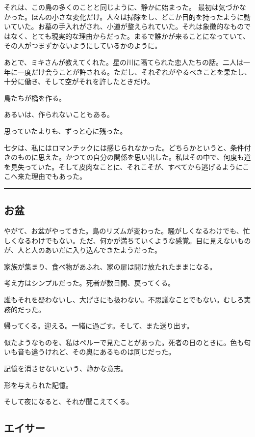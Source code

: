 \documentclass[
  letterpaper,
  oneside]{scrbook}
\begin{document}
それは、この島の多くのことと同じように、静かに始まった。
最初は気づかなかった。ほんの小さな変化だけ。人々は掃除をし、どこか目的を持ったように動いていた。お墓の手入れがされ、小道が整えられていた。それは象徴的なものではなく、とても現実的な理由からだった。まるで誰かが来ることになっていて、その人がつまずかないようにしているかのように。

あとで、ミキさんが教えてくれた。星の川に隔てられた恋人たちの話。二人は一年に一度だけ会うことが許される。ただし、それぞれがやるべきことを果たし、十分に働き、そして空がそれを許したときだけ。

鳥たちが橋を作る。

あるいは、作られないこともある。

思っていたよりも、ずっと心に残った。

七夕は、私にはロマンチックには感じられなかった。どちらかというと、条件付きのものに思えた。かつての自分の関係を思い出した。私はその中で、何度も道を見失っていた。そして皮肉なことに、それこそが、すべてから逃げるようにここへ来た理由でもあった。

\begin{center}\rule{0.5\linewidth}{0.5pt}\end{center}

\subsection{お盆}\label{ux304aux76c6}

やがて、お盆がやってきた。島のリズムが変わった。騒がしくなるわけでも、忙しくなるわけでもない。ただ、何かが満ちていくような感覚。目に見えないものが、人と人のあいだに入り込んできたようだった。

家族が集まり、食べ物があふれ、家の扉は開け放たれたままになる。

考え方はシンプルだった。死者が数日間、戻ってくる。

誰もそれを疑わないし、大げさにも扱わない。不思議なことでもない。むしろ実務的だった。

帰ってくる。迎える。一緒に過ごす。そして、また送り出す。

似たようなものを、私はペルーで見たことがあった。死者の日のときに。色も匂いも音も違うけれど、その奥にあるものは同じだった。

記憶を消させないという、静かな意志。

形を与えられた記憶。

そして夜になると、それが聞こえてくる。

\subsection{エイサー}\label{ux30a8ux30a4ux30b5ux30fc}
\end{document}
